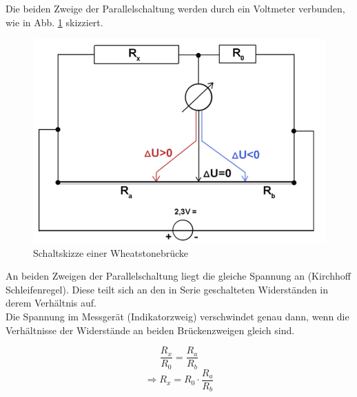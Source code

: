 \documentclass[12pt,a4paper]{article}
\begin{document}
\begin{multicols}{2}
Die beiden Zweige der Parallelschaltung werden durch ein Voltmeter verbunden, wie in Abb. \ref{fig:wheatstone_schaltplan} skizziert.



\begin{figure}[H]
	\centering
	\includegraphics[scale=0.50]{./figure/wheatstone_schaltplan.png}
	\caption{Schaltskizze einer Wheatstonebrücke}
	\label{fig:wheatstone_schaltplan}
\end{figure}

An beiden Zweigen der Parallelschaltung liegt die gleiche Spannung an (Kirchhoff Schleifenregel). Diese teilt sich an den in Serie geschalteten Widerständen in derem Verhältnis auf.\\
Die Spannung im Messgerät (Indikatorzweig) verschwindet genau dann, wenn die Verhältnisse der Widerstände an beiden Brückenzweigen gleich sind.

$$\frac{R_x}{R_0} = \frac{R_a}{R_b}$$
$$\Rightarrow R_x = R_0 \cdot \frac{R_a}{R_b}$$


\end{multicols}
\end{document}
